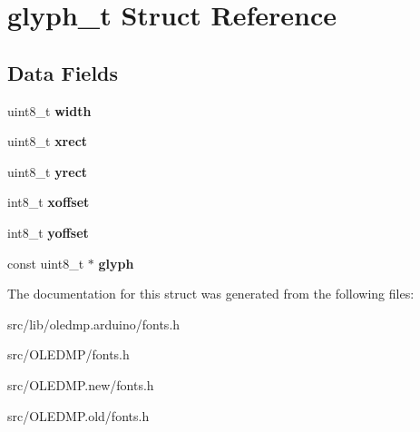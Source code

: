 \hypertarget{structglyph__t}{\section{glyph\-\_\-t Struct Reference}
\label{structglyph__t}
}
\subsection*{Data Fields}
\begin{DoxyCompactItemize}
\item 
\hypertarget{structglyph__t_a09a2a45f731b02946ff6d3cd15c1a476}{uint8\-\_\-t {\bfseries width}}\label{structglyph__t_a09a2a45f731b02946ff6d3cd15c1a476}

\item 
\hypertarget{structglyph__t_a46d1f5dd7c1a75b29bd8ff4572263129}{uint8\-\_\-t {\bfseries xrect}}\label{structglyph__t_a46d1f5dd7c1a75b29bd8ff4572263129}

\item 
\hypertarget{structglyph__t_a59c390ac18717a7ff28f85cc8a829a8e}{uint8\-\_\-t {\bfseries yrect}}\label{structglyph__t_a59c390ac18717a7ff28f85cc8a829a8e}

\item 
\hypertarget{structglyph__t_a248c78bc36899ea7581e379d926f480a}{int8\-\_\-t {\bfseries xoffset}}\label{structglyph__t_a248c78bc36899ea7581e379d926f480a}

\item 
\hypertarget{structglyph__t_a1f3726a53d108483e5f64b4cf1edda88}{int8\-\_\-t {\bfseries yoffset}}\label{structglyph__t_a1f3726a53d108483e5f64b4cf1edda88}

\item 
\hypertarget{structglyph__t_a96cacb34e6264e70f536ac76a3a8577f}{const uint8\-\_\-t $\ast$ {\bfseries glyph}}\label{structglyph__t_a96cacb34e6264e70f536ac76a3a8577f}

\end{DoxyCompactItemize}


The documentation for this struct was generated from the following files\-:\begin{DoxyCompactItemize}
\item 
src/lib/oledmp.\-arduino/fonts.\-h\item 
src/\-O\-L\-E\-D\-M\-P/fonts.\-h\item 
src/\-O\-L\-E\-D\-M\-P.\-new/fonts.\-h\item 
src/\-O\-L\-E\-D\-M\-P.\-old/fonts.\-h\end{DoxyCompactItemize}
